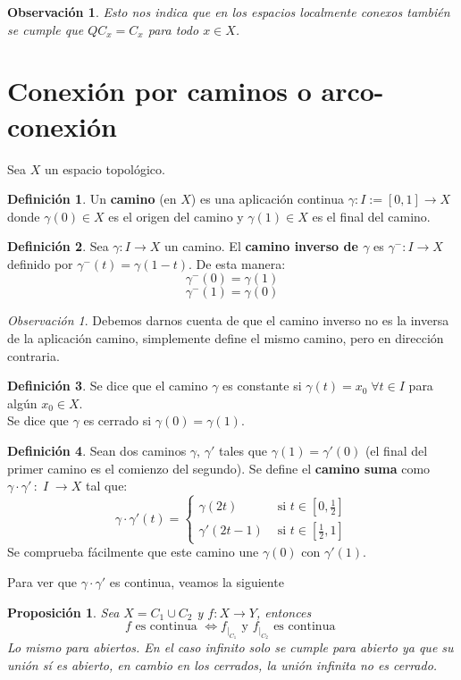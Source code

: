 \documentclass[12pt,twoside]{report}
\theoremstyle{azul}
\theoremstyle{azul2}
\newtheorem*{obsx}{Observación}
\theoremstyle{plain}
\newtheorem*{prop}{Proposición}
\theoremstyle{definition}
\newtheorem*{defi}{Definición}
\theoremstyle{remark}
\newtheorem*{obs}{Observación}
\begin{document}
\begin{obsx}
Esto nos indica que en los espacios localmente conexos también se cumple que $QC_x = C_x$ para todo $x \in X$.
\end{obsx}


\section{Conexión por caminos o arco-conexión} \label{cpc}
Sea $X$ un espacio topológico.
\begin{defi}
Un \textbf{camino} (en $X$) es una aplicación continua $\gamma: I:=[0,1] \longrightarrow X$ donde $\gamma(0) \in X$ es el origen del camino y $\gamma(1) \in X$ es el final del camino.
\end{defi}
\begin{defi}
Sea $\gamma: I \longrightarrow X$ un camino. El \textbf{camino inverso de $\gamma$} es $\gamma^{-}: I \longrightarrow X$ definido por $\gamma^{-}(t)=\gamma(1-t)$. De esta manera:
$$\gamma^{-}(0)=\gamma(1)$$
$$\gamma^{-}(1)=\gamma(0)$$
\end{defi}
\begin{obs}
Debemos darnos cuenta de que el camino inverso no es la inversa de la aplicación camino, simplemente define el mismo camino, pero en dirección contraria.
\end{obs}

\begin{defi}
Se dice que el camino $\gamma$ es constante si $\gamma(t) = x_0 \; \forall t \in I$ para algún $x_0 \in X$.\\
Se dice que $\gamma$ es cerrado si $\gamma(0) = \gamma(1)$.
\end{defi}

\begin{defi} \label{compcam}
Sean dos caminos $\gamma , \, \gamma'$ tales que $\gamma(1) = \gamma'(0)$ (el final del primer camino es el comienzo del segundo). Se define el \textbf{camino suma} como $\gamma \cdot \gamma' \, : \; I \; \longrightarrow X$ tal que:
$$\gamma \cdot \gamma' (t)=\left\{ \begin{array}{ll}
         \gamma(2t) & \text{ si } t \in [0,\frac{1}{2}] \\
         \gamma'(2t-1) & \text{ si } t \in [\frac{1}{2},1] 
    \end{array} \right.$$
Se comprueba fácilmente que este camino une $\gamma(0)$ con $\gamma'(1)$.
\end{defi}
Para ver que $\gamma \cdot \gamma'$ es continua, veamos la siguiente
\begin{prop}
Sea $X=C_1 \cup C_2$ y $f: X \longrightarrow Y$, entonces
$$f \text{ es continua } \iff f_{|_{C_1}} \text{ y } f_{|_{C_2}} \text{ es continua }$$
Lo mismo para abiertos. En el caso infinito solo se cumple para abierto ya que su unión sí es abierto, en cambio en los cerrados, la unión infinita no es cerrado.
\end{prop}
\end{document}

